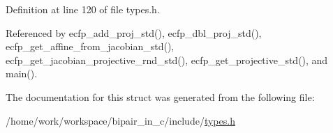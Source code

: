 Definition at line 120 of file types.\-h.



Referenced by ecfp\-\_\-add\-\_\-proj\-\_\-std(), ecfp\-\_\-dbl\-\_\-proj\-\_\-std(), ecfp\-\_\-get\-\_\-affine\-\_\-from\-\_\-jacobian\-\_\-std(), ecfp\-\_\-get\-\_\-jacobian\-\_\-projective\-\_\-rnd\-\_\-std(), ecfp\-\_\-get\-\_\-projective\-\_\-std(), and main().



The documentation for this struct was generated from the following file\-:\begin{DoxyCompactItemize}
\item 
/home/work/workspace/bipair\-\_\-in\-\_\-c/include/\hyperlink{types_8h}{types.\-h}\end{DoxyCompactItemize}
